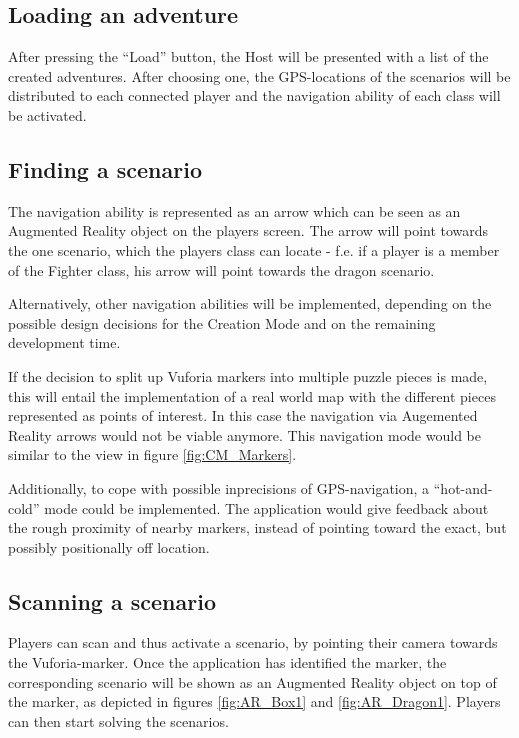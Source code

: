 \documentclass{sigchi-ext}
\begin{document}
\subsection{Loading an adventure}

After pressing the ``Load'' button, the Host will be presented with a list of the created adventures. After choosing one, the GPS-locations of the scenarios will be distributed to each connected player and the navigation ability of each class will be activated.

\subsection{Finding a scenario}

The navigation ability is represented as an arrow which can be seen as an Augmented Reality object on the players screen. The arrow will point towards the one scenario, which the players class can locate - f.e. if a player is a member of the Fighter class, his arrow will point towards the dragon scenario.

Alternatively, other navigation abilities will be implemented, depending on the possible design decisions for the Creation Mode and on the remaining development time. 

If the decision to split up Vuforia markers into multiple puzzle pieces is made, this will entail the implementation of a real world map with the different pieces represented as points of interest. In this case the navigation via Augemented Reality arrows would not be viable anymore. This navigation mode would be similar to the view in figure \ref{fig:CM_Markers}.

Additionally, to cope with possible inprecisions of GPS-navigation, a ``hot-and-cold'' mode could be implemented. The application would give feedback about the rough proximity of nearby markers, instead of pointing toward the exact, but possibly positionally off location.

\subsection{Scanning a scenario}

Players can scan and thus activate a scenario, by pointing their camera towards the Vuforia-marker. Once the application has identified the marker, the corresponding scenario will be shown as an Augmented Reality object on top of the marker, as depicted in figures \ref{fig:AR_Box1} and \ref{fig:AR_Dragon1}. Players can then start solving the scenarios.
\end{document}

